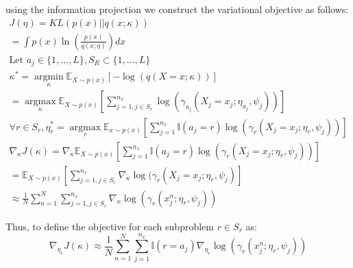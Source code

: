 \documentclass{article}
\begin{document}
using the information projection we construct the variational objective as follows:
\begin{align*}
  J(\eta) = KL(p(x) || q(x; \kappa)) \\
   = \int p(x)\ln\left(\frac{p(x)}{q(x;\eta)}\right) dx \\
   \text{Let } a_{j} \in \{1, \ldots, L\} , S_{R} \subset \{1, \ldots, L\} \\
   \kappa^{*} = \operatorname*{argmin}_{\kappa} \mathbb{E}_{X \sim p(x)}[-\log(q(X=x; \kappa))] \\
   = \operatorname*{argmax}_{\kappa} \mathbb{E}_{X \sim p(x)}[\sum^{n_x}_{j=1, j \in S_r} \log( \gamma_{a_j}(X_j = x_j ; \eta_{a_j}, \psi_j))] \\
   \forall r \in S_r, \eta^{*}_r = \operatorname*{argmax}_{r} \mathbb{E}_{x \sim p(x)}[\sum^{n_x}_{j=1}\mathbb{I}(a_j =r) \log(\gamma_r (X_j = x_j ; \eta_r, \psi_j))] \\
   \nabla_{\kappa} J(\kappa) = \nabla_{\kappa} \mathbb{E}_{X \sim p(x)}[\sum^{n_x}_{j=1}\mathbb{I}(a_j =r) \log(\gamma_r (X_j = x_j ; \eta_r, \psi_j))] \\
   = \mathbb{E}_{X \sim p(x)}[ \sum^{n_x}_{j=1, j \in S_r} \nabla_\kappa \log(\gamma_r (X_j = x_j ; \eta_r, \psi_j)]\\
   \approx \frac{1}{N} \sum^{N}_{n=1} \sum^{n_x}_{j=1, j\in S_r} \nabla_{\kappa}\log(\gamma_r (x^{n}_j ; \eta_r, \psi_j))
\end{align*}
 
Thus, to define the objective for each subproblem $r  \in S_{r}$ as:
\begin{equation}
  \label{eq:objective}
  \nabla_{\eta_r} J(\kappa) \approx \frac{1}{N} \sum^{N}_{n=1} \sum^{n_x}_{j=1} \mathbb{I}(r=a_j) \nabla_{\eta_r}\log(\gamma_r (x^{n}_j ; \eta_r, \psi_j))
\end{equation}
\end{document}
